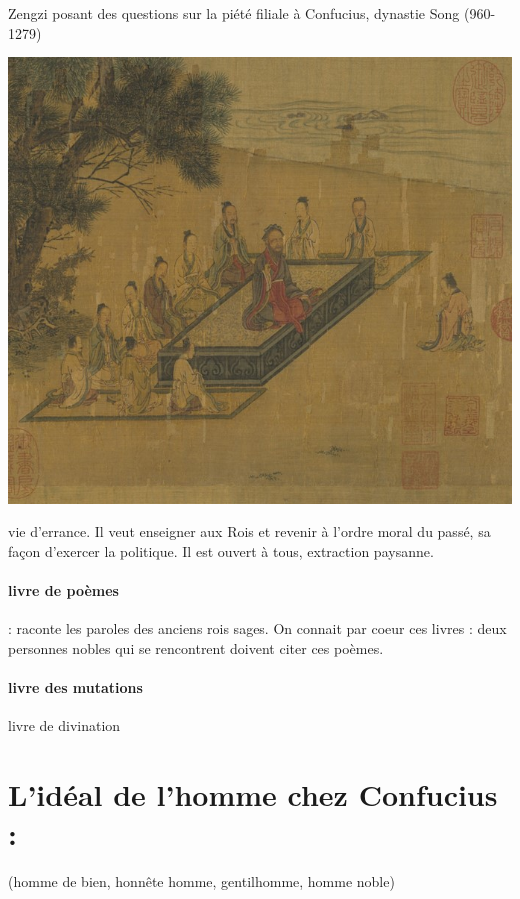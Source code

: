  \begin{marginfigure}
    \centering
    \caption{Zengzi posant des questions sur la piété filiale à Confucius, dynastie Song (960-1279)}
    \includegraphics[width=\textwidth]{ConfucianismeTaoismeBouddhismeChinois/Images/EnseignementConfucius.jpg}

    \label{fig:enter-label}
\end{marginfigure}
\begin{Synthesis}
    vie d'errance. Il veut enseigner aux Rois et revenir à l'ordre moral du passé, sa façon d'exercer la politique. 
    Il est ouvert à tous, extraction paysanne. 
\end{Synthesis}


\paragraph{livre de poèmes } : raconte les paroles des anciens rois sages. On connait par coeur ces livres : deux personnes nobles qui se rencontrent doivent citer ces poèmes.
\paragraph{livre des mutations} livre de divination
\section{L’idéal de l’homme chez Confucius :}  
\begin{Def}[Le junzi 君子]
     (homme de bien, honnête homme, gentilhomme, homme noble)   
\end{Def}

